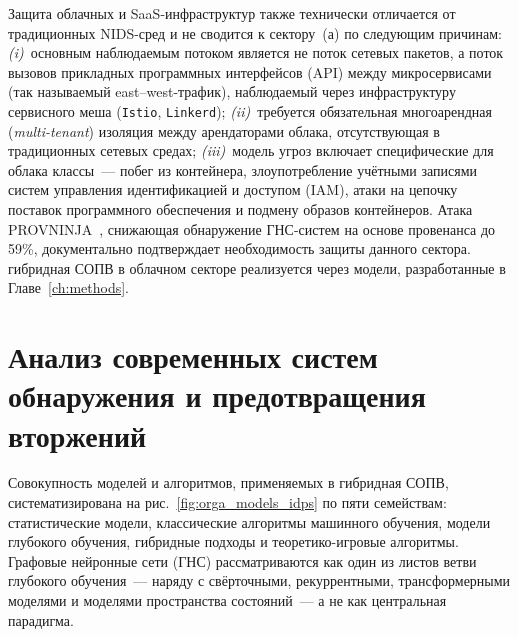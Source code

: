 Защита облачных и SaaS-инфраструктур также технически отличается от
традиционных NIDS-сред и не сводится к сектору~(а) по следующим
причинам:
\emph{(i)}~основным наблюдаемым потоком является не поток
сетевых пакетов, а поток вызовов прикладных программных интерфейсов
(API) между микросервисами (так называемый east--west-трафик),
наблюдаемый через инфраструктуру сервисного меша
(\texttt{Istio}, \texttt{Linkerd});
\emph{(ii)}~требуется обязательная многоарендная (\emph{multi-tenant})
изоляция между арендаторами облака, отсутствующая в традиционных
сетевых средах;
\emph{(iii)}~модель угроз включает специфические для облака классы~---
побег из контейнера, злоупотребление учётными записями систем
управления идентификацией и доступом (IAM), атаки на цепочку
поставок программного обеспечения и подмену образов контейнеров.
Атака PROVNINJA~\cite{PROVNINJA2023}, снижающая обнаружение
ГНС-систем на основе провенанса до 59\%, документально подтверждает
необходимость защиты данного сектора. гибридная СОПВ в облачном
секторе реализуется через модели, разработанные в Главе~\ref{ch:methods}.


\section{Анализ современных систем обнаружения и предотвращения вторжений}
\label{sec:idps_models_taxonomy}

Совокупность моделей и алгоритмов, применяемых в гибридная СОПВ,
систематизирована на рис.~\ref{fig:orga_models_idps} по пяти
семействам: статистические модели, классические алгоритмы
машинного обучения, модели глубокого обучения, гибридные подходы и
теоретико-игровые алгоритмы. Графовые нейронные сети (ГНС)
рассматриваются как один из листов ветви глубокого обучения~---
наряду с свёрточными, рекуррентными, трансформерными моделями и
моделями пространства состояний~--- а не как центральная парадигма.

